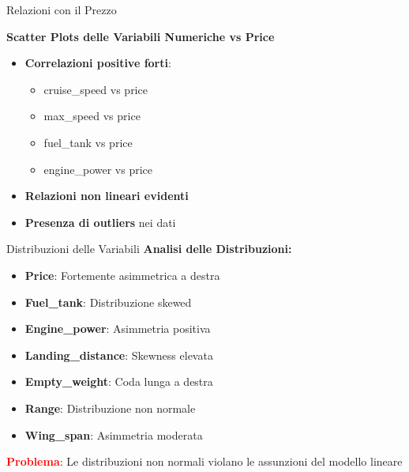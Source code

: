 \documentclass{beamer}
\begin{document}
\begin{frame}{Relazioni con il Prezzo}
\begin{center}
\textbf{Scatter Plots delle Variabili Numeriche vs Price}
\end{center}

\begin{itemize}
    \item \textbf{Correlazioni positive forti}:
    \begin{itemize}
        \item cruise\_speed vs price
        \item max\_speed vs price
        \item fuel\_tank vs price
        \item engine\_power vs price
    \end{itemize}
    \item \textbf{Relazioni non lineari evidenti}
    \item \textbf{Presenza di outliers} nei dati
\end{itemize}
\end{frame}

\begin{frame}{Distribuzioni delle Variabili}
\textbf{Analisi delle Distribuzioni:}

\begin{itemize}
    \item \textbf{Price}: Fortemente asimmetrica a destra
    \item \textbf{Fuel\_tank}: Distribuzione skewed
    \item \textbf{Engine\_power}: Asimmetria positiva
    \item \textbf{Landing\_distance}: Skewness elevata
    \item \textbf{Empty\_weight}: Coda lunga a destra
    \item \textbf{Range}: Distribuzione non normale
    \item \textbf{Wing\_span}: Asimmetria moderata
\end{itemize}

\vspace{0.5cm}
\textcolor{red}{\textbf{Problema}}: Le distribuzioni non normali violano le assunzioni del modello lineare
\end{frame}
\end{document}
